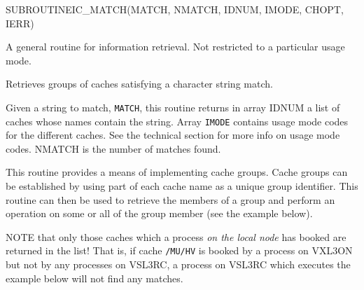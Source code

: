 \begin{routine} %
\subroutine
   {SUBROUTINE}{IC\_MATCH}{(MATCH, NMATCH, IDNUM, IMODE, CHOPT, IERR)}
\begin{overview}
A general routine for information retrieval. 
Not restricted to a particular usage mode.

Retrieves groups of caches satisfying a character string match.

\end{overview}
\begin{argdeflist}
\end{argdeflist}
\begin{describe}

Given a string to match, {\tt MATCH}, this routine returns
 in array IDNUM a list of
caches whose names contain the string. Array {\tt IMODE}
contains usage mode codes for the different caches. See the technical
section for more info on usage mode codes.
NMATCH is the number of matches found.

This routine provides a means of implementing cache groups.
Cache groups can be established by using part
of each cache name as a unique group identifier. This routine can
then be used to retrieve the members of a group and perform an
operation on some or all of the group member (see the example below).

NOTE that only those caches which a process {\em on the local node}
has booked are returned in the list! That is, if cache 
\verb|/MU/HV| is booked
by a process on VXL3ON but not by any processes on VSL3RC, a
process on VSL3RC which executes the example below will not find
any matches.


\end{describe}
\end{routine}
